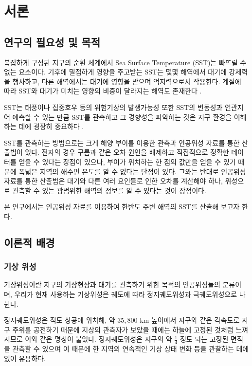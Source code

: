 \section{서론}

\subsection{연구의 필요성 및 목적}

복잡하게 구성된 지구의 순환 체계에서 Sea Surface Temperature (SST)는 빠뜨릴 수 없는 요소이다. 기후에 밀접하게 영향을 주고받는 SST는 몇몇 해역에서 대기에 강제력을 행사하고, 다른 해역에서는 대기에 영향을 받으며 억지력으로서 작용한다. 계절에 따라 SST와 대기가 미치는 영향의 비중이 달라지는 해역도 존재한다 \cite{wu2007regimes}.
 
SST는  태풍이나 집중호우 등의 위험기상의 발생가능성 또한 SST의 변동성과 연관지어 예측할 수 있는 만큼 SST를 관측하고 그 경향성을 파악하는 것은 지구 환경을 이해하는 데에 굉장히 중요하다 \cite{정은실2019한반도에서}. 

SST를 관측하는 방법으로는 크게 해양 부이를 이용한 관측과 인공위성 자료를 통한 산출법이 있다. 전자의 경우 구름과 같은 오차 원인을 배제하고 직접적으로 정확한 데이터를 얻을 수 있다는 장점이 있으나, 부이가 위치하는 한 점의 값만을 얻을 수 있기 때문에 폭넓은 지역의 해수면 온도를 알 수 없다는 단점이 있다. 그와는 반대로 인공위성 자료를 통한 산출법은 대기와 다른 여러 요인들로 인한 오차를 계산해야 하나, 위성으로 관측할 수 있는 광범위한 해역의 정보를 알 수 있다는 것이 장점이다. 

본 연구에서는 인공위성 자료를 이용하여 한반도 주변 해역의 SST를 산출해 보고자 한다.

\newpage
\subsection{이론적 배경}

\subsubsection{기상 위성}

기상위성이란 지구의 기상현상과 대기를 관측하기 위한 목적의 인공위성들의 분류이며, 우리가 현재 사용하는 기상위성은 궤도에 따라 정지궤도위성과 극궤도위성으로 나뉜다. 

정지궤도위성은 적도 상공에 위치해, 약 $35,800 \textrm{ km}$ 높이에서 지구와 같은 각속도로 지구 주위를 공전하기 때문에 지상의 관측자가 보았을 때에는 하늘에 고정된 것처럼 느껴지므로 이와 같은 명칭이 붙었다. 정지궤도위성은 지구의 약 $\frac{1}{4}$ 정도 되는 고정된 면적을 관측할 수 있으며 이 때문에 한 지역의 연속적인 기상 상태 변화 등을 관찰하는 데에 있어 유용하다. 

